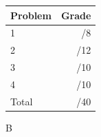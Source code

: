 \documentclass[12pt]{article}
\newcommand{\skipline}{\vspace{12pt}}
\begin{document}
\begin{table}[hbt]
\begin{center}
\begin{tabular}{|l|r|} \hline
Problem &Grade\\
\hline \hline
\cline{1-2} 1 & \enspace\enspace\enspace\enspace\enspace\enspace/8\\
\cline{1-2} 2 & \enspace\enspace\enspace\enspace\enspace\enspace/12\\
\cline{1-2} 3 & \enspace\enspace\enspace\enspace\enspace\enspace/10\\
\cline{1-2} 4 & \enspace\enspace\enspace\enspace\enspace\enspace/10\\
\cline{1-2} Total & \enspace\enspace\enspace\enspace\enspace\enspace/40\\
\hline
\end{tabular}

\skipline

\skipline

\skipline

B
\end{center}
\end{table}
\newpage
\end{document}
